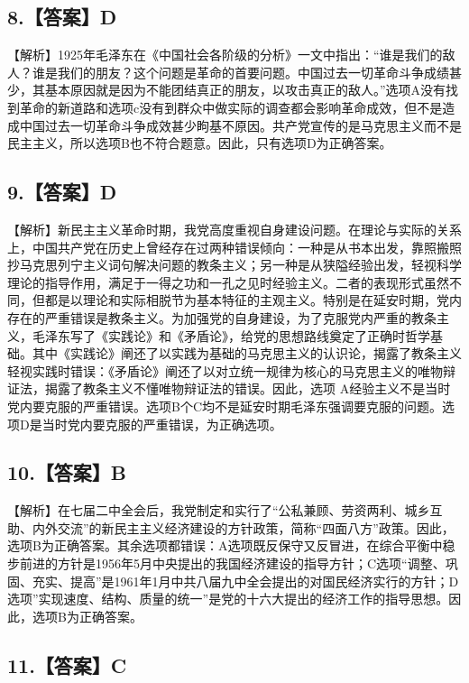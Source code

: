 \documentclass[UTF8,11pt]{ctexart}
\begin{document}
\subsection*{8.【答案】D}

【解析】1925年毛泽东在《中国社会各阶级的分析》一文中指出：“谁是我们的敌人？谁是我们的朋友？这个问题是革命的首要问题。中国过去一切革命斗争成绩甚少，其基本原因就是因为不能团结真正的朋友，以攻击真正的敌人。”选项A没有找到革命的新道路和选项c没有到群众中做实际的调查都会影响革命成效，但不是造成中国过去一切革命斗争成效甚少眗基不原因。共产党宣传的是马克思主义而不是民主主义，所以选项B也不符合题意。因此，只有选项D为正确答案。


\subsection*{9.【答案】D}

【解析】新民主主义革命时期，我党高度重视自身建设问题。在理论与实际的关系上，中国共产党在历史上曾经存在过两种错误倾向：一种是从书本出发，靠照搬照抄马克思列宁主义词句解决问题的教条主义；另一种是从狭隘经验出发，轻视科学理论的指导作用，满足于一得之功和一孔之见时经验主义。二者的表现形式虽然不同，但都是以理论和实际相脱节为基本特征的主观主义。特别是在延安时期，党内存在的严重错误是教条主义。为加强党的自身建设，为了克服党内严重的教条主义，毛泽东写了《实践论》和《矛盾论》，给党的思想路线奠定了正确时哲学基础。其中《实践论》阐还了以实践为基础的马克思主义的认识论，揭露了教条主义轻视实践时错误：《矛盾论》阐还了以对立统一规律为核心的马克思主义的唯物辩证法，揭露了教条主义不懂唯物辩证法的错误。因此，选项 A经验主义不是当时党内要克服的严重错误。选项B个C均不是延安时期毛泽东强调要克服的问题。选项D是当时党内要克服的严重错误，为正确选项。


\subsection*{10.【答案】B}

【解析】在七届二中全会后，我党制定和实行了“公私兼顾、劳资两利、城乡互助、内外交流”的新民主主义经济建设的方针政策，简称“四面八方”政策。因此，选项B为正确答案。其余选项都错误：A选项既反保守又反冒进，在综合平衡中稳步前进的方针是1956年5月中央提出的我国经济建设的指导方针；C选项“调整、巩固、充实、提高”是1961年1月中共八届九中全会提出的对国民经济实行的方针；D选项”实现速度、结构、质量的统一”是党的十六大提出的经济工作的指导思想。因此，选项B为正确答案。


\subsection*{11.【答案】C}
\end{document}
